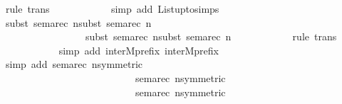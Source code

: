 \begin{isabellebody}
{\isacharparenleft}{\kern0pt}rule\ trans{\isacharparenright}{\kern0pt}\isanewline
\ \ \ \ \ \ \ \ \ \ \ \isamarkupfalse%
{\isacharparenleft}{\kern0pt}simp\ add{\isacharcolon}{\kern0pt}\ List{\isachardot}{\kern0pt}upto{\isachardot}{\kern0pt}simps{\isacharparenright}{\kern0pt}\isanewline
\ \ \ \ \ \ \ \ \ \ \isamarkupfalse%
{\isacharparenleft}{\kern0pt}subst\ sema{\isacharunderscore}{\kern0pt}rec{\isacharbrackleft}{\kern0pt}\ n{\isacharequal}{\kern0pt}{\isacartoucheopen}{}{\isacartoucheclose}{\isacharbrackright}{\kern0pt}{\isacharcomma}{\kern0pt}subst\ sema{\isacharunderscore}{\kern0pt}rec{\isacharbrackleft}{\kern0pt}\ n{\isacharequal}{\kern0pt}{\isacartoucheopen}{}{\isacartoucheclose}{\isacharbrackright}{\kern0pt}{\isacharcomma}{\kern0pt}\isanewline
\ \ \ \ \ \ \ \ \ \ \ \ \ \ \ \ subst\ sema{\isacharunderscore}{\kern0pt}rec{\isacharbrackleft}{\kern0pt}\ n{\isacharequal}{\kern0pt}{\isacartoucheopen}{}{\isacartoucheclose}{\isacharbrackright}{\kern0pt}{\isacharcomma}{\kern0pt}subst\ sema{\isacharunderscore}{\kern0pt}rec{\isacharbrackleft}{\kern0pt}\ n{\isacharequal}{\kern0pt}{\isacartoucheopen}{}{\isacartoucheclose}{\isacharbrackright}{\kern0pt}{\isacharparenright}{\kern0pt}\ \isanewline
\ \ \ \ \ \ \ \ \ \ \isamarkupfalse%
{\isacharparenleft}{\kern0pt}rule\ trans{\isacharparenright}{\kern0pt}\isanewline
\ \ \ \ \ \ \ \ \ \ \isamarkupfalse%
{\isacharparenleft}{\kern0pt}simp\ add{\isacharcolon}{\kern0pt}\ inter{}Mprefix{}\ inter{}Mprefix{}{\isacharparenright}{\kern0pt}\isanewline
\ \ \ \ \ \ \ \ \ \ \isamarkupfalse%
{\isacharparenleft}{\kern0pt}simp\ add{\isacharcolon}{\kern0pt}\ sema{\isacharunderscore}{\kern0pt}rec{\isacharbrackleft}{\kern0pt}\ n{\isacharequal}{\kern0pt}{\isacartoucheopen}{}{\isacartoucheclose}{\isacharcomma}{\kern0pt}symmetric{\isacharbrackright}{\kern0pt}\ \isanewline
\ \ \ \ \ \ \ \ \ \ \ \ \ \ \ \ \ \ \ \ \ \ \ \ \ \ sema{\isacharunderscore}{\kern0pt}rec{\isacharbrackleft}{\kern0pt}\ n{\isacharequal}{\kern0pt}{\isacartoucheopen}{}{\isacartoucheclose}{\isacharcomma}{\kern0pt}symmetric{\isacharbrackright}{\kern0pt}\ \isanewline
\ \ \ \ \ \ \ \ \ \ \ \ \ \ \ \ \ \ \ \ \ \ \ \ \ \ sema{\isacharunderscore}{\kern0pt}rec{\isacharbrackleft}{\kern0pt}\ n{\isacharequal}{\kern0pt}{\isacartoucheopen}{}{\isacartoucheclose}{\isacharcomma}{\kern0pt}symmetric{\isacharbrackright}{\kern0pt}\ \isanewline

\end{isabellebody}
